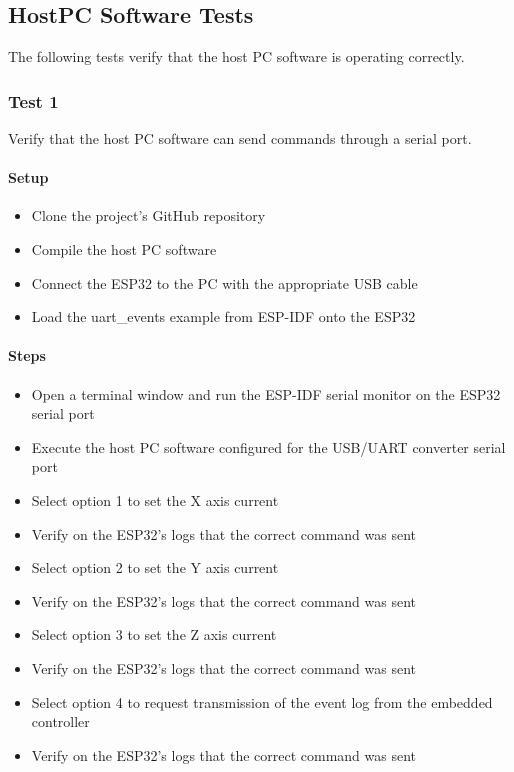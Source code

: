 \documentclass[10pt,twocolumn,letterpaper]{article}
\begin{document}
\subsection{HostPC Software Tests}

The following tests verify that the host PC software is operating correctly.

\subsubsection{Test 1}

Verify that the host PC software can send commands through a serial port.

\paragraph{Setup}
\begin{itemize}
  \item Clone the project's GitHub repository \cite{mygit}
  \item Compile the host PC software
  \item Connect the ESP32 to the PC with the appropriate USB cable
  \item Load the uart\_events example from ESP-IDF onto the ESP32
\end{itemize}

\paragraph{Steps}
\begin{itemize}
  \item Open a terminal window and run the ESP-IDF serial monitor on the ESP32 serial port
  \item Execute the host PC software configured for the USB/UART converter serial port
  \item Select option 1 to set the X axis current
  \item Verify on the ESP32's logs that the correct command was sent
  \item Select option 2 to set the Y axis current
  \item Verify on the ESP32's logs that the correct command was sent
  \item Select option 3 to set the Z axis current
  \item Verify on the ESP32's logs that the correct command was sent
  \item Select option 4 to request transmission of the event log from the embedded controller
  \item Verify on the ESP32's logs that the correct command was sent
\end{itemize}
\end{document}
